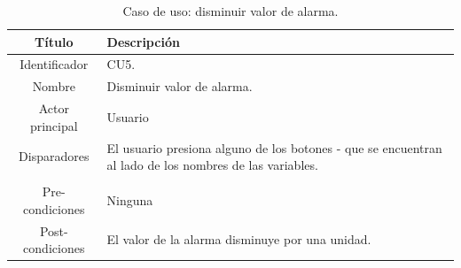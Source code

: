 \begin{table}[htpb]
	\centering
	\caption{Caso de uso: disminuir valor de alarma.}
	\centering
	\begin{tabular}{c p{}}    
		\toprule
		\textbf{Título }     & \textbf{Descripción} \\
		\midrule
		Identificador		&	CU5. \\
		Nombre				& 	Disminuir valor de alarma. \\
		Actor principal		&   Usuario \\
		Disparadores		&   El usuario presiona alguno de los botones - que se encuentran al lado de los nombres de las variables. \\
\\
		Pre-condiciones		&   Ninguna \\
		Post-condiciones	&   El valor de la alarma disminuye por una unidad.\\
		\bottomrule
	\end{tabular}
\label{tab:caso-decrementar}
\end{table}

